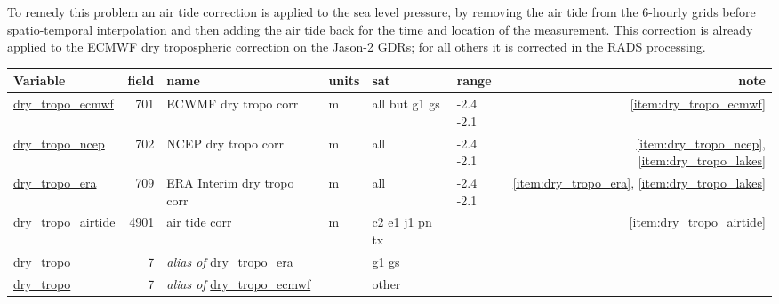 \documentclass[a4paper,11pt,openany,natbib,nomargin]{thesis}
\makeatletter
\newcommand\var[1]{\url{#1}\index{variables!#1@\protect\url{#1}}}
\newcommand\alias[1]{\emph{alias of} \var{#1}}
\newenvironment{vartable}{
\begin{table}[ht]
\small
\begin{tabular}{lrllllr}
\hline
Variable & field & name & units & sat & range & note \\
\hline
}{
\hline
\end{tabular}
\end{table}
}
\makeatother
\begin{document}
To remedy this problem an air tide correction is applied to the sea level pressure, by removing the air tide from the 6-hourly grids before spatio-temporal interpolation and then adding the air tide back for the time and location of the measurement. This correction is already applied to the ECMWF dry tropospheric correction on the Jason-2 GDRs; for all others it is corrected in the RADS processing.

\begin{vartable}
\var{dry_tropo_ecmwf} & 701 & ECWMF dry tropo corr & m & all but g1 gs & -2.4 -2.1 & \ref{item:dry_tropo_ecmwf} \\
\var{dry_tropo_ncep}  & 702 & NCEP dry tropo corr  & m & all & -2.4 -2.1 & \ref{item:dry_tropo_ncep}, \ref{item:dry_tropo_lakes} \\
\var{dry_tropo_era}   & 709 & ERA Interim dry tropo corr   & m & all & -2.4 -2.1 & \ref{item:dry_tropo_era}, \ref{item:dry_tropo_lakes} \\
\var{dry_tropo_airtide} & 4901 & air tide corr     & m & c2 e1 j1 pn tx & & \ref{item:dry_tropo_airtide} \\
\hline
\var{dry_tropo}       &   7 & \alias{dry_tropo_era} && g1 gs && \\
\var{dry_tropo}       &   7 & \alias{dry_tropo_ecmwf} && other && \\
\end{vartable}
\end{document}
